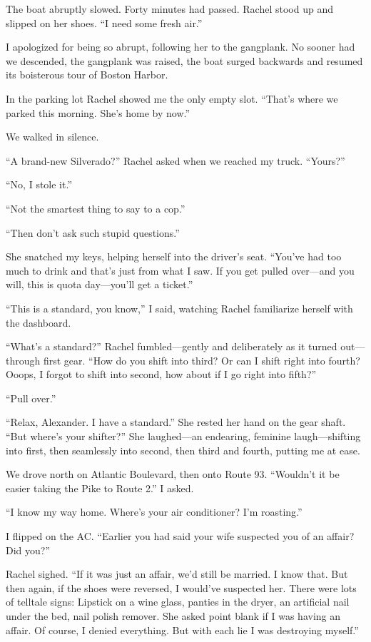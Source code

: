 The boat abruptly slowed. Forty minutes had passed. Rachel stood up and
slipped on her shoes. ``I need some fresh air.''

I apologized for being so abrupt, following her to the gangplank. No
sooner had we descended, the gangplank was raised, the boat surged
backwards and resumed its boisterous tour of Boston Harbor.

In the parking lot Rachel showed me the only empty slot. ``That's where
we parked this morning. She's home by now.''

We walked in silence.

``A brand-new Silverado?'' Rachel asked when we reached my truck.
``Yours?''

``No, I stole it.''

``Not the smartest thing to say to a cop.''

``Then don't ask such stupid questions.''

She snatched my keys, helping herself into the driver's seat. ``You've
had too much to drink and that's just from what I saw. If you get pulled
over---and you will, this is quota day---you'll get a ticket.''

``This is a standard, you know,'' I said, watching Rachel familiarize
herself with the dashboard.

``What's a standard?'' Rachel fumbled---gently and deliberately as it
turned out---through first gear. ``How do you shift into third? Or can I
shift right into fourth? Ooops, I forgot to shift into second, how about
if I go right into fifth?''

``Pull over.''

``Relax, Alexander. I have a standard.'' She rested her hand on the gear
shaft. ``But where's your shifter?'' She laughed---an endearing,
feminine laugh---shifting into first, then seamlessly into second, then
third and fourth, putting me at ease.

We drove north on Atlantic Boulevard, then onto Route 93. \linebreak ``Wouldn't it
be easier taking the Pike to Route 2.'' I asked.

``I know my way home. Where's your air conditioner? I'm roasting.''

I flipped on the AC. ``Earlier you had said your wife suspected you of
an affair? Did you?''

Rachel sighed. ``If it was just an affair, we'd still be married. I know
that. But then again, if the shoes were reversed, I would've suspected
her. There were lots of telltale signs: Lipstick on a wine glass,
panties in the dryer, an artificial nail under the bed, nail polish
remover. She asked point blank if I was having an affair. Of course, I
denied everything. But with each lie I was destroying myself.''

